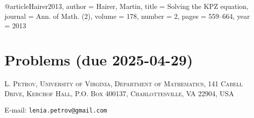 \documentclass[letterpaper,11pt,oneside,reqno]{article}
\numberwithin{equation}{section}
\theoremstyle{definition}
\begin{document}
@article{Hairer2013,
  author    = {Hairer, Martin},
  title     = {Solving the {KPZ} equation},
  journal   = {Ann. of Math. (2)},
  volume    = {178},
  number    = {2},
  pages     = {559--664},
  year      = {2013}
}



















\appendix
\setcounter{section}{11}

\section{Problems (due 2025-04-29)}









\medskip

\textsc{L. Petrov, University of Virginia, Department of Mathematics, 141 Cabell Drive, Kerchof Hall, P.O. Box 400137, Charlottesville, VA 22904, USA}

E-mail: \texttt{lenia.petrov@gmail.com}
\end{document}
